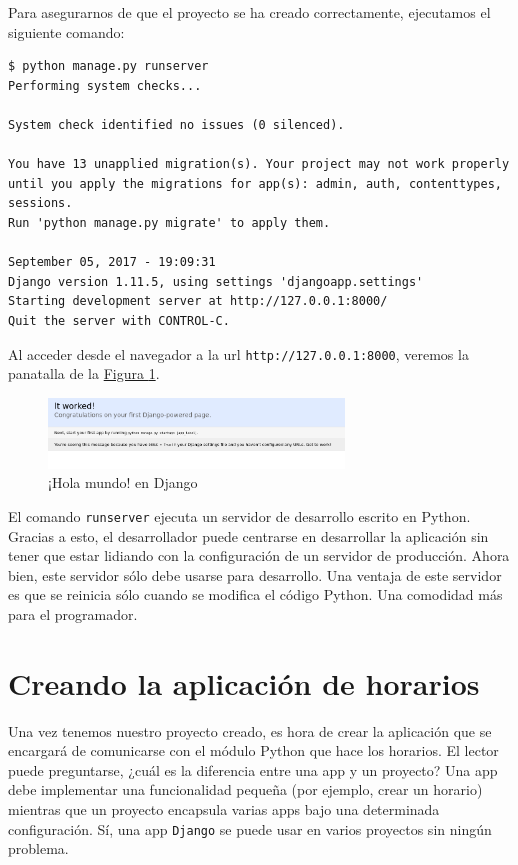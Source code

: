 Para asegurarnos de que el proyecto se ha creado correctamente, ejecutamos el siguiente comando:

\begin{verbatim}
$ python manage.py runserver
Performing system checks...

System check identified no issues (0 silenced).

You have 13 unapplied migration(s). Your project may not work properly until you apply the migrations for app(s): admin, auth, contenttypes, sessions.
Run 'python manage.py migrate' to apply them.

September 05, 2017 - 19:09:31
Django version 1.11.5, using settings 'djangoapp.settings'
Starting development server at http://127.0.0.1:8000/
Quit the server with CONTROL-C.
\end{verbatim}

Al acceder desde el navegador a la url \texttt{http://127.0.0.1:8000}, veremos la panatalla de la \hyperref[djangook]{Figura \ref*{djangook}}.

\begin{figure}
\centering
\includegraphics[width=0.7\textwidth]{img/djangook}
\caption{¡Hola mundo! en Django}
\label{djangook}
\end{figure}

El comando \texttt{runserver} ejecuta un servidor de desarrollo escrito en Python. Gracias a esto, el desarrollador puede centrarse en desarrollar la aplicación sin tener que estar lidiando con la configuración de un servidor de producción. Ahora bien, este servidor sólo debe usarse para desarrollo. Una ventaja de este servidor es que se reinicia sólo cuando se modifica el código Python. Una comodidad más para el programador.

\section{Creando la aplicación de horarios}
Una vez tenemos nuestro proyecto creado, es hora de crear la aplicación que se encargará de comunicarse con el módulo Python que hace los horarios. El lector puede preguntarse, ¿cuál es la diferencia entre una app y un proyecto? Una app debe implementar una funcionalidad pequeña (por ejemplo, crear un horario) mientras que un proyecto encapsula varias apps bajo una determinada configuración. Sí, una app \texttt{Django} se puede usar en varios proyectos sin ningún problema.

